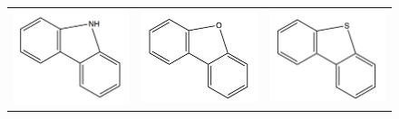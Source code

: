 \begin{figure}[p]
\begin{center}
{\begin{tabular}{c c c}
 			\includegraphics[scale=0.3]{image/carbazole-f} & \includegraphics[scale=0.3]{image/dibenzofuran} & \includegraphics[scale=0.3]{image/dibenzothiophene-f} \\

\end{tabular}}
\end{center}
\end{figure}
